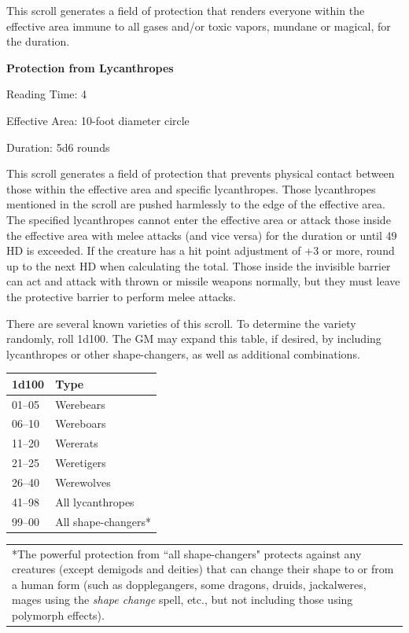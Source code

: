 \begin{multicols}{2}
This scroll generates a field of protection that renders everyone within the effective area immune to all gases and/or toxic vapors, mundane or magical, for the duration.

\vspace{1em}
\noindent \begin{minipage}{\columnwidth}

\noindent \textbf{Protection from Lycanthropes}

\noindent Reading Time: 4

\noindent Effective Area: 10-foot diameter circle

\noindent Duration: 5d6 rounds

\end{minipage}

This scroll generates a field of protection that prevents physical contact between those within the effective area and specific lycanthropes.  Those lycanthropes mentioned in the scroll are pushed harmlessly to the edge of the effective area.  The specified lycanthropes cannot enter the effective area or attack those inside the effective area with melee attacks (and vice versa) for the duration or until 49 HD is exceeded.  If the creature has a hit point adjustment of +3 or more, round up to the next HD when calculating the total.  Those inside the invisible barrier can act and attack with thrown or missile weapons normally, but they must leave the protective barrier to perform melee attacks.  

There are several known varieties of this scroll.  To determine the variety randomly, roll 1d100.  The GM may expand this table, if desired, by including lycanthropes or other shape-changers, as well as additional combinations.

\noindent
\begin{tabular}{|p{}|p{}|}
\hline
1d100	& Type \\
\hline\hline
\rowcolor[gray]{.9}01--05	& Werebears \\
06--10	& Wereboars \\
\rowcolor[gray]{.9}11--20	& Wererats \\
21--25	& Weretigers \\
\rowcolor[gray]{.9}26--40	& Werewolves \\
41--98	& All lycanthropes \\
\rowcolor[gray]{.9}99--00	& All shape-changers* \\
\hline
\end{tabular}
\noindent\begin{tabular}{p{}}
*The powerful protection from ``all shape-changers" protects against any creatures (except demigods and deities) that can change their shape to or from a human form (such as dopplegangers, some dragons, druids, jackalweres, mages using the \textit{shape change} spell, etc., but not including those using polymorph effects). \\
\end{tabular}\vspace{.5em}


\end{multicols}
